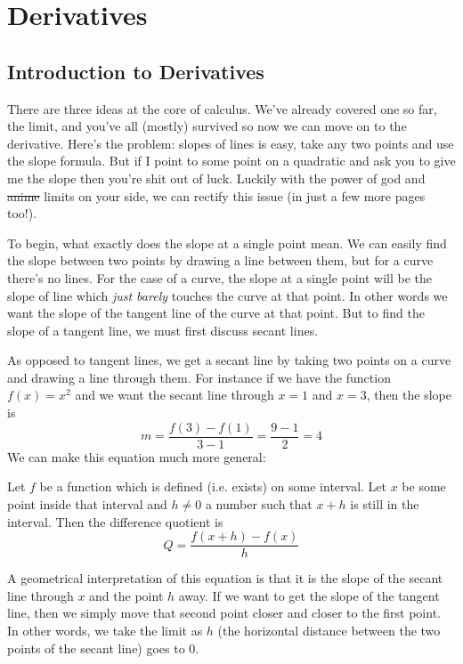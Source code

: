 \section{Derivatives}
\subsection{Introduction to Derivatives}

There are three ideas at the core of calculus. We've already covered one so far, the limit, and you've all (mostly) survived so now we can move on to the derivative. Here's the problem: slopes of lines is easy, take any two points and use the slope formula. But if I point to some point on a quadratic and ask you to give me the slope then you're shit out of luck. Luckily with the power of god and \st{anime} limits on your side, we can rectify this issue (in just a few more pages too!).

To begin, what exactly does the slope at a single point mean. We can easily find the slope between two points by drawing a line between them, but for a curve there's no lines. For the case of a curve, the slope at a single point will be the slope of line which \emph{just barely} touches the curve at that point. In other words we want the slope of the tangent line of the curve at that point. But to find the slope of a tangent line, we must first discuss secant lines.

As opposed to tangent lines, we get a secant line by taking two points on a curve and drawing a line through them. For instance if we have the function $f(x) = x^2$ and we want the secant line through $x = 1$ and $x = 3$, then the slope is
\[ m = \frac{f(3) - f(1)}{3 - 1} = \frac{9 - 1}{2} = 4 \]
We can make this equation much more general:

\begin{definition}
	Let $f$ be a function which is defined (i.e. exists) on some interval. Let $x$ be some point inside that interval and $h \neq 0$ a number such that $x + h$ is still in the interval. Then the difference quotient is
	\[ Q = \frac{f(x + h) - f(x)}{h} \]
\end{definition}

A geometrical interpretation of this equation is that it is the slope of the secant line through $x$ and the point $h$ away. If we want to get the slope of the tangent line, then we simply move that second point closer and closer to the first point. In other words, we take the limit as $h$ (the horizontal distance between the two points of the secant line) goes to 0.


